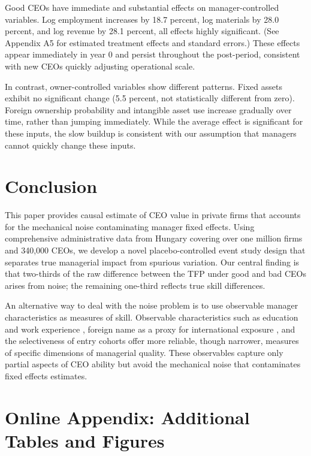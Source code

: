 \documentclass[11pt,a4paper]{article}
\begin{document}


Good CEOs have immediate and substantial effects on manager-controlled variables. Log employment increases by 18.7 percent, log materials by 28.0 percent, and log revenue by 28.1 percent, all effects highly significant. (See Appendix A5 for estimated treatment effects and standard errors.) These effects appear immediately in year 0 and persist throughout the post-period, consistent with new CEOs quickly adjusting operational scale.

In contrast, owner-controlled variables show different patterns. Fixed assets exhibit no significant change (5.5 percent, not statistically different from zero). Foreign ownership probability and intangible asset use increase gradually over time, rather than jumping immediately. While the average effect is significant for these inputs, the slow buildup is consistent with our assumption that managers cannot quickly change these inputs.


\section{Conclusion}

This paper provides causal estimate of CEO value in private firms that accounts for the mechanical noise contaminating manager fixed effects. Using comprehensive administrative data from Hungary covering over one million firms and 340,000 CEOs, we develop a novel placebo-controlled event study design that separates true managerial impact from spurious variation. Our central finding is that two-thirds of the raw difference between the TFP under good and bad CEOs arises from noise; the remaining one-third reflects true skill differences. 

An alternative way to deal with the noise problem is to use observable manager characteristics as measures of skill. Observable characteristics such as education and work experience \citep{DePirro2025}, foreign name as a proxy for international exposure \citep{Koren2023expat}, and the selectiveness of entry cohorts \citep{koren2024managers} offer more reliable, though narrower, measures of specific dimensions of managerial quality. These observables capture only partial aspects of CEO ability but avoid the mechanical noise that contaminates fixed effects estimates.





\appendix
\section{Online Appendix: Additional Tables and Figures}
\renewcommand{\thefigure}{A\arabic{figure}}
\renewcommand{\thetable}{A\arabic{table}}
\setcounter{figure}{0}
\setcounter{table}{0}
\end{document}
